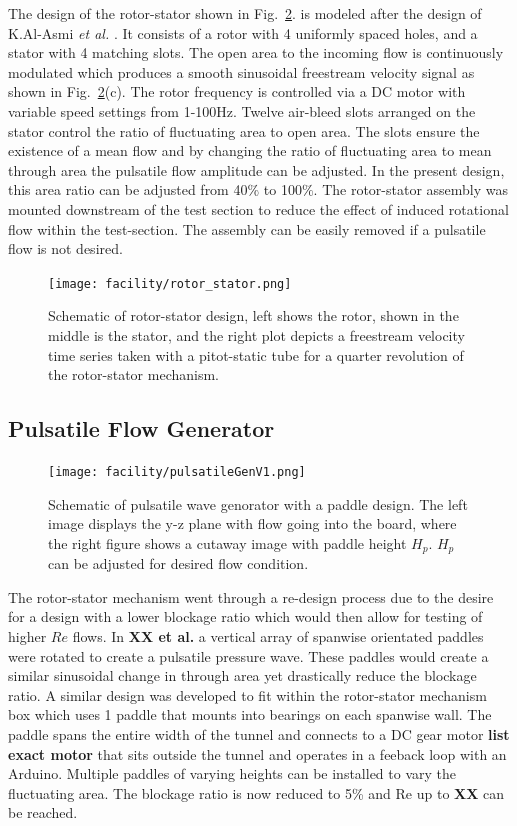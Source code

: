 The design of the rotor-stator shown in Fig.~\ref{fig:rotor_stator}. is modeled after the design of K.Al-Asmi \textit{et al.} \cite{K.Al-Asmi1993}.
It consists of a rotor with 4 uniformly spaced holes, and a stator with 4 matching slots. 
The open area to the incoming flow is continuously modulated which produces a smooth sinusoidal freestream velocity signal as shown in Fig.~\ref{fig:rotor_stator}(c). 
The rotor frequency is controlled via a DC motor with variable speed settings from 1-100Hz. 
Twelve air-bleed slots arranged on the stator control the ratio of fluctuating area to open area. 
The slots ensure the existence of a mean flow and by changing the ratio of fluctuating area to mean through area the pulsatile flow amplitude can be adjusted. 
In the present design, this area ratio can be adjusted from 40$\%$ to 100$\%$. 
The rotor-stator assembly was mounted downstream of the test section to reduce the effect of induced rotational flow within the test-section. 
The assembly can be easily removed if a pulsatile flow is not desired.
 
\begin{figure}[t!]
\centering
\texttt{[image: facility/rotor\_stator.png]}
\caption{ \footnotesize Schematic of rotor-stator design, left shows the rotor, shown in the middle is the stator, and the right plot depicts a freestream velocity time series taken with a pitot-static tube for a quarter revolution of the rotor-stator mechanism.}
\label{fig:rotor_stator}
\end{figure}

\subsection{Pulsatile Flow Generator}

\begin{figure}[t!]
\centering
\texttt{[image: facility/pulsatileGenV1.png]}
\caption{ \footnotesize Schematic of pulsatile wave genorator with a paddle design. The left image displays the y-z plane with flow going into the board, where the right figure shows a cutaway image with paddle height $H_p$. $H_p$ can be adjusted for desired flow condition.}
\label{fig:rotor_stator}
\end{figure}

The rotor-stator mechanism went through a re-design process due to the desire for a design with a lower blockage ratio which would then allow for testing of higher $Re$ flows.
In {\bf XX et al.} a vertical array of spanwise orientated paddles were rotated to create a pulsatile pressure wave.
These paddles would create a similar sinusoidal change in through area yet drastically reduce the blockage ratio.
A similar design was developed to fit within the rotor-stator mechanism box which uses 1 paddle that mounts into bearings on each spanwise wall.
The paddle spans the entire width of the tunnel and connects to a DC gear motor {\bf list exact motor} that sits outside the tunnel and operates in a feeback loop with an Arduino.
Multiple paddles of varying heights can be installed to vary the fluctuating area.
The blockage ratio is now reduced to 5\% and Re up to {\bf XX} can be reached.

